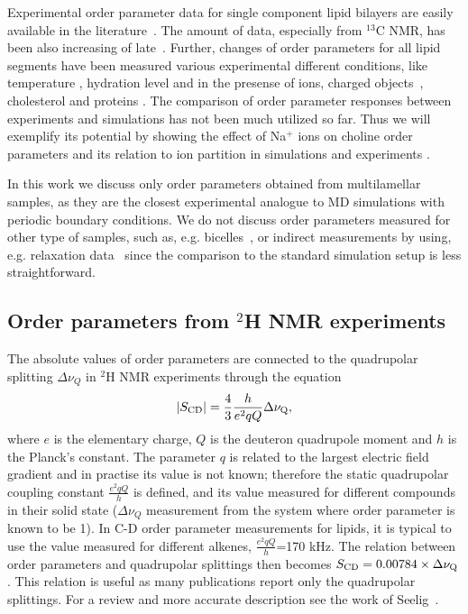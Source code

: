 \documentclass[aps,prl,superscriptaddress,twocolumn]{revtex4}
\begin{document}
Experimental order parameter data for single component lipid bilayers are easily available in the literature~\cite{castro07,castro08,leftin11,marsh13,ferreira13,leftin13,leftin14,botan15}. 
The amount of data, especially from $^{13}$C NMR, has been also increasing of late~\cite{castro07,castro08,ferreira13,leftin13,leftin14}.
Further, changes of order parameters for all lipid segments have been measured various experimental
different conditions, like temperature \cite{??}, hydration level \cite{bechinger91,ulrich94,mallikarjunaiah11,dvinskikh05a} and in the presense of ions, charged objects~\cite{akutsu81,altenbach84,seelig87,scherer89}, 
cholesterol \cite{brown78,douliez95,ferreira13,leftin14} and proteins \cite{kuchinka89,roux90,leftin13}.
The comparison of order parameter responses between experiments and simulations
has not been much utilized so far. Thus we will exemplify its potential by showing
the effect of Na$^+$ ions on choline order parameters and its relation to ion partition in 
simulations \cite{ionpaper} and experiments \cite{akutsu81,altenbach84,seelig87,scherer89}.

In this work we discuss only order parameters obtained from multilamellar samples, as they are  the closest experimental analogue to MD simulations with periodic boundary conditions. 
We do not discuss order parameters measured for other type of samples, such as,
e.g. bicelles~\cite{aussenac03,raffard00,sanders92}, or indirect measurements by using, e.g. relaxation
data~\cite{marbella15} since the comparison to the standard simulation setup is less straightforward.  



\subsection{Order parameters from $^2$H NMR experiments}\label{DopSECTION}

The absolute values of order parameters are connected to the quadrupolar splitting $\Delta \nu_Q$ 
in $^2$H NMR experiments through the equation 
\begin{equation}\label{HNMRop}
|S_{{\rm CD}}|=\frac{4}{3} \frac{h}{e^2qQ} \Delta \nu_{{\rm Q}}, 
\end{equation}
where $e$ is the elementary charge, $Q$ is the deuteron quadrupole moment and $h$ is the Planck's constant. 
The parameter $q$ is related to the largest electric field gradient and in practise its value is not known; 
therefore the static quadrupolar coupling constant $\frac{e^2qQ}{h}$ is defined, and its value measured for 
different compounds in their solid state ($\Delta \nu_Q$ measurement from the system where order parameter is known to be 1). 
In C-D order parameter measurements for lipids, it is typical to 
use the value measured for different alkenes, $\frac{e^2qQ}{h}$=170 kHz. The relation between order parameters 
and quadrupolar splittings then becomes $S_{{\rm CD}}=0.00784 \times \Delta \nu_{{\rm Q}}$.
This relation is useful as many publications report only the quadrupolar splittings. For a review and more accurate description see the work of Seelig~\cite{seelig77c}.
\end{document}

